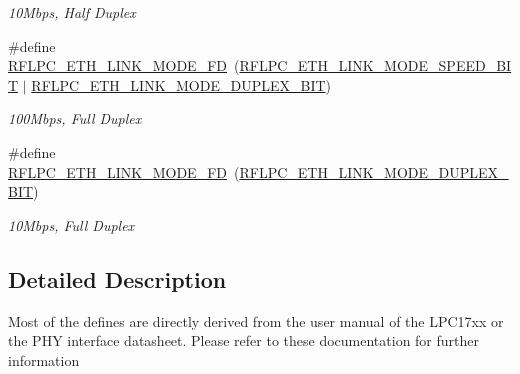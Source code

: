 \begin{DoxyCompactItemize}
\begin{DoxyCompactList}\small\item\em 10\-Mbps, Half Duplex \end{DoxyCompactList}\item 
\hypertarget{group__eth_ga250b55f95bb7d9c45f813c1f6275577a}{\#define \hyperlink{group__eth_ga250b55f95bb7d9c45f813c1f6275577a}{R\-F\-L\-P\-C\-\_\-\-E\-T\-H\-\_\-\-L\-I\-N\-K\-\_\-\-M\-O\-D\-E\-\_\-F\-D}~(\hyperlink{group__eth_gaa7db2e40e7ee0641b8ef48fe7e8f5a29}{R\-F\-L\-P\-C\-\_\-\-E\-T\-H\-\_\-\-L\-I\-N\-K\-\_\-\-M\-O\-D\-E\-\_\-\-S\-P\-E\-E\-D\-\_\-\-B\-I\-T} $|$ \hyperlink{group__eth_ga8662c8abfaba91f359fc0c002bf5575f}{R\-F\-L\-P\-C\-\_\-\-E\-T\-H\-\_\-\-L\-I\-N\-K\-\_\-\-M\-O\-D\-E\-\_\-\-D\-U\-P\-L\-E\-X\-\_\-\-B\-I\-T})}\label{group__eth_ga250b55f95bb7d9c45f813c1f6275577a}

\begin{DoxyCompactList}\small\item\em 100\-Mbps, Full Duplex \end{DoxyCompactList}\item 
\hypertarget{group__eth_gafb92b1abb1013a1f56a1d39198af3e52}{\#define \hyperlink{group__eth_gafb92b1abb1013a1f56a1d39198af3e52}{R\-F\-L\-P\-C\-\_\-\-E\-T\-H\-\_\-\-L\-I\-N\-K\-\_\-\-M\-O\-D\-E\-\_\-F\-D}~(\hyperlink{group__eth_ga8662c8abfaba91f359fc0c002bf5575f}{R\-F\-L\-P\-C\-\_\-\-E\-T\-H\-\_\-\-L\-I\-N\-K\-\_\-\-M\-O\-D\-E\-\_\-\-D\-U\-P\-L\-E\-X\-\_\-\-B\-I\-T})}\label{group__eth_gafb92b1abb1013a1f56a1d39198af3e52}

\begin{DoxyCompactList}\small\item\em 10\-Mbps, Full Duplex \end{DoxyCompactList}\end{DoxyCompactItemize}


\subsection{Detailed Description}
Most of the defines are directly derived from the user manual of the L\-P\-C17xx or the P\-H\-Y interface datasheet. Please refer to these documentation for further information 

